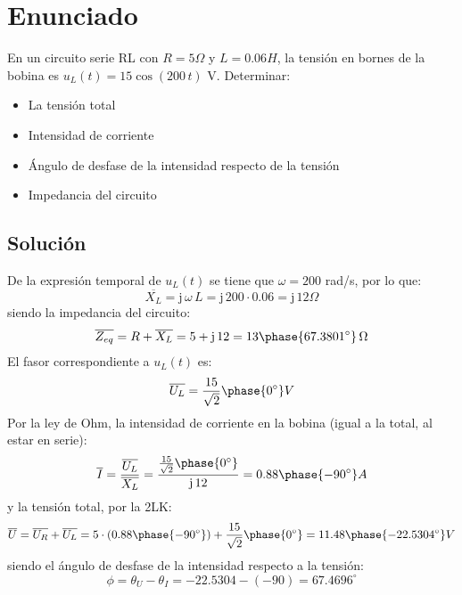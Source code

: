 
\section{Enunciado}
En un circuito serie RL con $R=5\Omega$ y $L=0.06H$, la tensión en
bornes de la bobina es $u_L(t)=15\cos(200\,t)$ V. Determinar:
\begin{itemize}
\item La tensión total
\item Intensidad de corriente
\item Ángulo de desfase de la intensidad respecto de la tensión
\item Impedancia del circuito
\end{itemize}

\subsection*{Solución}

De la expresión temporal de $u_L(t)$ se tiene que $\omega=200$ rad/s,
por lo que:
\begin{equation*}
  \overline{X_L}=\mathrm{j}\,\omega\,L=\mathrm{j}\,200\cdot0.06=\mathrm{j}\,12\Omega
\end{equation*}
siendo la impedancia del circuito:
\begin{equation*}
  \overline{Z_{eq}}=R+\overline{X_L}=5+\mathrm{j}\,12=13\phase{67.3801^\circ}\,\Omega
\end{equation*}
El fasor correspondiente a $u_L(t)$ es:
\begin{equation*}
  \overline{U_L}=\dfrac{15}{\sqrt{2}}\phase{0^\circ}V
\end{equation*}
Por la ley de Ohm, la intensidad de corriente en la bobina (igual a la
total, al estar en serie):
\begin{equation*}
  \overline{I}=\dfrac{\overline{U_L}}{\overline{X_L}}=\dfrac{\frac{15}{\sqrt{2}}\phase{0^\circ}}{\mathrm{j}\,12}=0.88\phase{-90^\circ}A
\end{equation*}
y la tensión total, por la 2LK:
\begin{equation*}
  \overline{U}=\overline{U_R}+\overline{U_L}=5\cdot (0.88\phase{-90^\circ})+\dfrac{15}{\sqrt{2}}\phase{0^\circ}=11.48\phase{-22.5304^\circ} V
\end{equation*}
siendo el ángulo de desfase de la intensidad respecto a la tensión:
\begin{equation*}
  \phi=\theta_U-\theta_I=-22.5304-(-90)=67.4696^\circ
\end{equation*}

